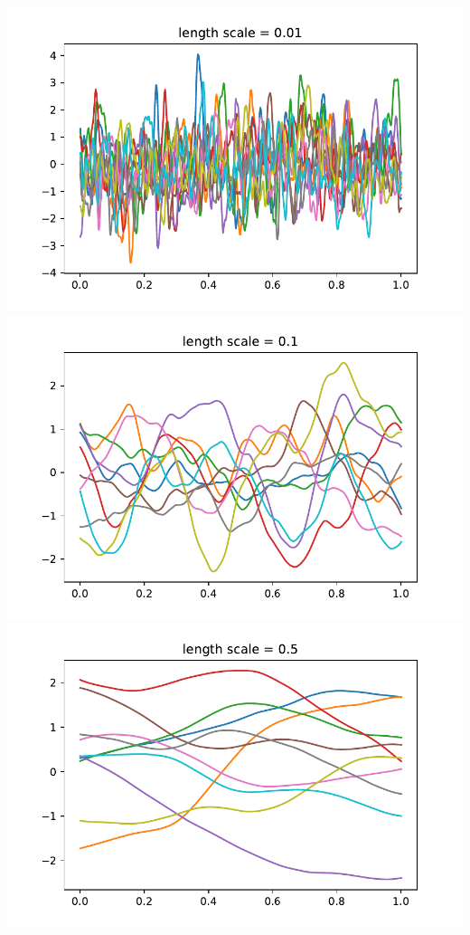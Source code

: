 \documentclass{beamer}
\begin{document}
\begin{frame}
\begin{columns}[t]
\centering
\includegraphics[height=0.3\textheight]{./img/matern_sample001}
\includegraphics[height=0.3\textheight]{./img/matern_sample01}
\includegraphics[height=0.3\textheight]{./img/matern_sample05}
\end{columns}
\end{frame}
\end{document}
